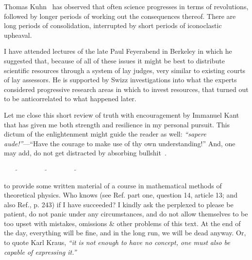 Thomas Kuhn~\cite[-30mm]{kuhn} has observed that often science progresses in terms of revolutions,
followed by longer periods of working out the consequences thereof.
There are long periods of consolidation, interrupted by short periods of
iconoclastic upheaval.

I have attended lectures of the late Paul Feyerabend\cite[-20mm]{feyerabend} in Berkeley in which he suggested that, because of
all of these issues it might be best to distribute scientific resources through a system of lay judges, very similar to
existing courts of lay assessors.
He is supported by Swizz investigations into what the experts considered progressive research areas in which to invest resources,
that turned out to be anticorrelated to what happened later\cite[-30mm]{swizz-science}.

Let me close this short review of truth with encouragement by Immanuel Kant
that has given me both strength and resilience in my personal pursuit.
This dictum of the enlightenment might guide the reader as well\cite[-30mm]{kant-Aufklaerung}:
{\it ``sapere aude!''}---``Have the courage to make use of thy own understanding!''
And, one may add, do not get distracted by absorbing bullshit~\cite[-10mm]{Frankfurt-OnBullshit}.

\begin{center}\color{black}
$\widetilde{\qquad \qquad }$
$\widetilde{\qquad \qquad}$
$\widetilde{\qquad \qquad }$
\end{center}




\newpage

to provide some written material of a course in mathematical methods of theoretical physics.
Who knows (see Ref.\cite{Aquinas} part one, question 14, article 13; and  also Ref.\cite{specker-60}, p. 243)
if I have succeeded?
I kindly ask the perplexed to please be patient, do not panic under any circumstances,
and do not allow themselves to be too upset with mistakes, omissions \& other problems of this text.
At the end of the day, everything will be fine, and in the long run, we will be dead anyway.
Or, to quote Karl Kraus, {\em ``it is not enough to have no concept,
one must also be capable of expressing it.''}

